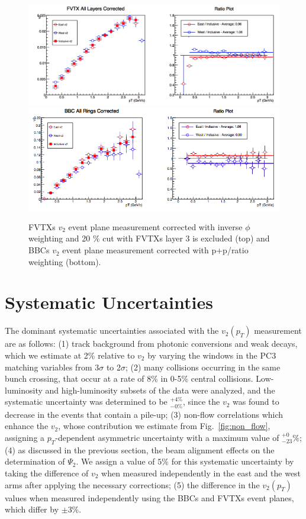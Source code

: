 \begin{figure}[!h]
\begin{center}
\includegraphics[width=0.75\linewidth]{figs/fvtx_corrected.png}
\includegraphics[width=0.75\linewidth]{figs/bbc_pp_correction.png}
\caption{ FVTXs $v_2$ event plane measurement corrected with inverse $\phi$ weighting and 20 $\%$ cut with FVTXs layer 3 is excluded (top) and BBCs $v_2$ event plane measurement corrected with p+p/\pau ratio weighting (bottom).}
\label{fig:fvtx_corrected_best}
\end{center}
\end{figure}

\section{Systematic Uncertainties}
The dominant systematic uncertainties associated with the $v_2(p_T)$ measurement are as follows: (1) track background from photonic conversions and weak decays, which we estimate at 2\% relative to $v_2$ by varying the windows in the PC3 matching variables from 3$\sigma$ to 2$\sigma$; (2) many collisions occurring in the same bunch crossing, that occur at a rate of 8\% in 0-5\% central \pau collisions. Low-luminosity and high-luminosity subsets of the data were analyzed, and the systematic uncertainty was determined to be $^{+4\%}_{-0\%}$, since the $v_2$  was found to decrease in the events that contain a pile-up; (3) non-flow correlations which enhance the $v_2$, whose contribution we estimate from Fig.~\ref{fig:non_flow}, assigning a $p_T$-dependent asymmetric uncertainty with a maximum value of $^{+0}_{-23}\%$; (4) as discussed in the previous section, the beam alignment effects on the determination of $\Psi_2$. We assign a value of $5\%$ for this systematic uncertainty by taking the difference of $v_2$ when measured independently in the east and the west arms after applying the necessary corrections; (5) the difference in the $v_2(p_T)$ values when measured independently using the BBCs and FVTXs event planes, which differ by $\pm$3\%. 

